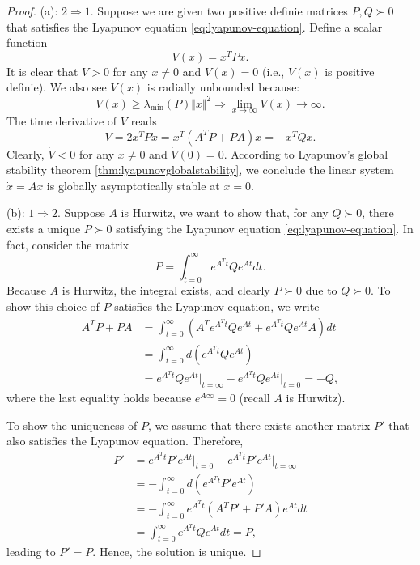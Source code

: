 \documentclass[
]{book}
\theoremstyle{definition}
\theoremstyle{definition}
\theoremstyle{definition}
\theoremstyle{definition}
\theoremstyle{remark}
\begin{document}
\begin{proof}
(a): \(2 \Rightarrow 1\). Suppose we are given two positive definie matrices \(P, Q \succ 0\) that satisfies the Lyapunov equation \eqref{eq:lyapunov-equation}. Define a scalar function
\[
V(x) = x^T P x.
\]
It is clear that \(V > 0\) for any \(x \neq 0\) and \(V(x) = 0\) (i.e., \(V(x)\) is positive definie). We also see \(V(x)\) is radially unbounded because:
\[
V(x) \geq \lambda_{\min}(P) \Vert x \Vert^2 \Rightarrow \lim_{x \rightarrow \infty} V(x) \rightarrow \infty.
\]
The time derivative of \(V\) reads
\[
\dot{V} = 2 x^T P \dot{x} = x^T (A^T P + P A) x = - x^T Q x. 
\]
Clearly, \(\dot{V} < 0\) for any \(x \neq 0\) and \(\dot{V}(0) = 0\). According to Lyapunov's global stability theorem \ref{thm:lyapunovglobalstability}, we conclude the linear system \(\dot{x} = Ax\) is globally asymptotically stable at \(x = 0\).

(b): \(1 \Rightarrow 2\). Suppose \(A\) is Hurwitz, we want to show that, for any \(Q \succ 0\), there exists a unique \(P \succ 0\) satisfying the Lyapunov equation \eqref{eq:lyapunov-equation}. In fact, consider the matrix
\[
P = \int_{t=0}^{\infty} e^{A^T t} Q e^{At} dt.
\]
Because \(A\) is Hurwitz, the integral exists, and clearly \(P \succ 0\) due to \(Q \succ 0\). To show this choice of \(P\) satisfies the Lyapunov equation, we write
\begin{align}
A^T P + P A &= \int_{t=0}^{\infty} \left( A^T e^{A^T t} Q e^{At} + e^{A^T t} Q e^{At} A  \right) dt \\
&=\int_{t=0}^{\infty} d \left( e^{A^T t} Q e^{At} \right) \\ 
& = e^{A^T t} Q e^{At}\vert_{t = \infty} - e^{A^T t} Q e^{At}\vert_{t = 0} = - Q,
\end{align}
where the last equality holds because \(e^{A \infty} = 0\) (recall \(A\) is Hurwitz).

To show the uniqueness of \(P\), we assume that there exists another matrix \(P'\) that also satisfies the Lyapunov equation. Therefore,
\begin{align}
P' &= e^{A^T t} P' e^{At} \vert_{t=0} - e^{A^T t} P' e^{At} \vert_{t=\infty} \\
 &= - \int_{t=0}^{\infty} d \left( e^{A^T t} P' e^{At} \right) \\
 &= - \int_{t=0}^{\infty} e^{A^T t} \left( A^T P' + P' A \right) e^{At} dt \\
 & = \int_{t=0}^{\infty} e^{A^T t} Q e^{At} dt = P,
\end{align}
leading to \(P' = P\). Hence, the solution is unique.
\end{proof}
\end{document}
